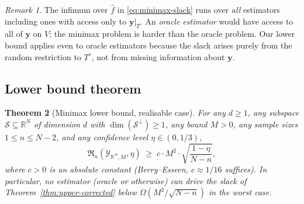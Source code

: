 \documentclass[11pt,a4paper]{article}
\theoremstyle{plain}
\newtheorem{theorem}{Theorem}
\theoremstyle{definition}
\theoremstyle{remark}
\newtheorem{remark}[theorem]{Remark}
\newcommand{\by}{\mathbf{y}}
\newcommand{\R}{\mathbb{R}}
\newcommand{\Scal}{\mathcal{S}}
\newcommand{\Ycal}{\mathcal{Y}}
\newcommand{\frR}{\mathfrak{R}}
\begin{document}
\begin{remark}
\label{rem:oracle-estimator}
The infimum over $\hat f$ in \eqref{eq:minimax-slack} runs over
\emph{all} estimators including ones with access only to $\by|_T$.  An
\emph{oracle estimator} would have access to all of $\by$ on $V$; the
minimax problem is harder than the oracle problem.  Our lower bound
applies even to oracle estimators because the slack arises purely
from the random restriction to $T^c$, not from missing information
about $\by$.
\end{remark}

\subsection{Lower bound theorem}

\begin{theorem}[Minimax lower bound, realisable case]
\label{thm:minimax-lower}
For any $d \geq 1$, any subspace $\Scal \subseteq \R^N$ of dimension $d$
with $\dim(\Scal^\perp) \geq 1$, any bound $M > 0$, any sample sizes
$1 \leq n \leq N-2$, and any confidence level $\eta \in (0, 1/3)$,
\begin{equation}
    \frR_n(\Ycal_{\R^N, M}, \eta)
    \;\geq\; c \cdot M^2 \cdot \sqrt{\frac{1 - \eta}{N - n}},
    \label{eq:minimax-lower}
\end{equation}
where $c > 0$ is an absolute constant (Berry--Esseen, $c \approx 1/16$
suffices).  In particular, no estimator (oracle or otherwise) can drive
the slack of Theorem~\ref{thm:upper-corrected} below
$\Omega(M^2/\sqrt{N-n})$ in the worst case.
\end{theorem}
\end{document}
